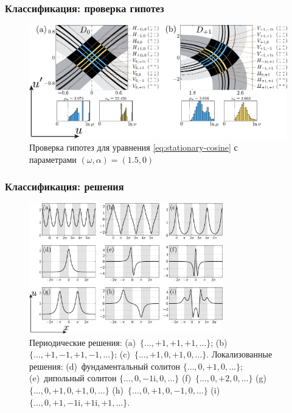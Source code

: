 \documentclass [10pt] {beamer}
\begin{document}
\begin{frame}
	\frametitle{Классификация: проверка гипотез}
	
	\begin{figure}[h!]
	\includegraphics[width = 1\textwidth]{pic/hypotheses for cosine equation}
	\caption{Проверка гипотез для уравнения \eqref{eq:stationary-cosine} с параметрами $(\omega, \alpha) = (1.5, 0)$}
	\end{figure}
\end{frame}

\begin{frame}
	\frametitle{Классификация: решения}
	
	\begin{figure}[h]
\centering
	\includegraphics[width = 0.75\textwidth]{pic/solutions for cosine equation}
	\caption{{\scriptsize
		Периодические решения: (a)~$\{ \dots, +1, +1, +1, \dots \}$; (b)~$\{ \dots, +1, -1, +1, -1, \dots \}$; (c)~$\{ \dots, +1, 0, +1, 0, \dots \}$.
		Локализованные решения: (d)~фундаментальный солитон $\{ \dots, 0, +1, 0, \dots \}$; (e)~дипольный солитон $\{ \dots, 0, -1\mathrm{i}, 0, \dots \}$ (f)~$\{ \dots, 0, +2, 0, \dots \}$ (g)~$\{ \dots, 0, +1, 0, +1, 0, \dots \}$ (h)~$\{ \dots, 0, +1, 0, -1, 0, \dots \}$ (i)~$\{ \dots, 0, +1, -1\mathrm{i}, +1\mathrm{i}, +1, \dots \}$.
	}}
	\end{figure}
\end{frame}
\end{document}
